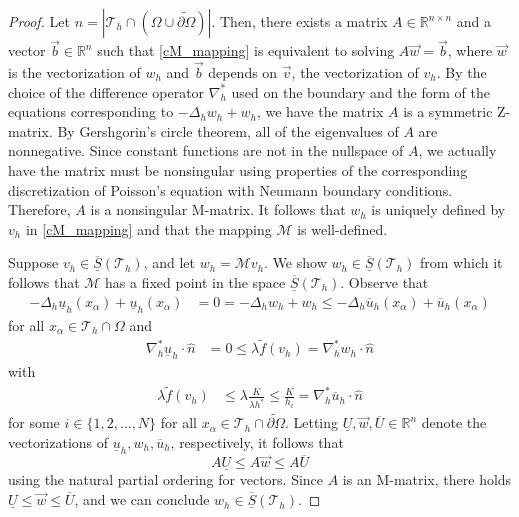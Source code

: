 \documentclass[12pt, reqno]{amsart}
\numberwithin{equation}{section}
\begin{document}
\begin{proof}
Let $n = | \mathcal{T}_h \cap (\Omega \cup \widetilde{\partial \Omega}) |$. 
Then, there exists a matrix $A \in \mathbb{R}^{n \times n}$ and a vector $\vec{b} \in \mathbb{R}^n$ such that 
\eqref{cM_mapping} is equivalent to solving $A \vec{w} = \vec{b}$, 
where $\vec{w}$ is the vectorization of $w_h$ 
and $\vec{b}$ depends on $\vec{v}$, the vectorization of $v_h$.  
By the choice of the difference operator $\nabla_h^*$ used on the boundary 
and the form of the equations corresponding to $-\Delta_h w_h + w_h$, 
we have the matrix $A$ is a symmetric Z-matrix.  
By Gershgorin's circle theorem, all of the eigenvalues of $A$ are nonnegative.  
Since constant functions are not in the nullspace of $A$, we actually have the matrix must be 
nonsingular using properties of the corresponding discretization of Poisson's equation with Neumann boundary conditions.  
Therefore, $A$ is a nonsingular M-matrix.  
It follows that $w_h$ is uniquely defined by $v_h$ in \eqref{cM_mapping} and that the mapping $\mathcal{M}$ is well-defined.  

Suppose $v_h \in \overline{\underline{S}}(\mathcal{T}_h)$, and let $w_h = \mathcal{M} v_h$.  
We show $w_h \in \overline{\underline{S}}(\mathcal{T}_h)$ 
from which it follows that $\mathcal{M}$ has a fixed point in the space $\overline{\underline{S}}(\mathcal{T}_h)$.  
Observe that 
\begin{align*}
    -\Delta_h \underline{u}_h(x_\alpha) + \underline{u}_h(x_\alpha) 
    & = 0 
    = -\Delta_{h} w_{h}+ w_{h} 
    \leq -\Delta_h \overline{u}_h(x_\alpha) + \overline{u}_h(x_\alpha) 
\end{align*}
for all $x_\alpha \in \mathcal{T}_h \cap \Omega$ 
and 
\begin{align*}
    \nabla_h^* \underline{u}_{h}  \cdot \widehat{n} 
    & = 0 
    \leq \lambda \widetilde{f}(v_h) 
    = \nabla_h^* w_{h}  \cdot \widehat{n}  
\end{align*}
with
\begin{align*}
    \lambda \widetilde{f}(v_h) 
    & \leq \lambda \frac{K}{\lambda h^*} 
    \leq \frac{K}{h_i} 
    = \nabla_h^* \overline{u}_{h}  \cdot \widehat{n} 
\end{align*}
for some $i \in \{1,2,\ldots,N\}$ 
for all $x_\alpha \in \mathcal{T}_h \cap \widetilde{\partial \Omega}$.  
Letting $\underline{U}, \vec{w}, \overline{U} \in \mathbb{R}^n$ denote the vectorizations of 
$\underline{u}_h, w_h, \overline{u}_h$, respectively, 
it follows that 
\[
    A \underline{U} \leq A \vec{w} \leq A \overline{U}  
\]
using the natural partial ordering for vectors.  
Since $A$ is an M-matrix, there holds $\underline{U} \leq \vec{w} \leq \overline{U}$, 
and we can conclude $w_h \in \overline{\underline{S}}(\mathcal{T}_h)$.  
\end{proof}
\end{document}
